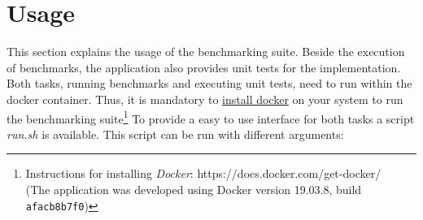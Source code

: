 \section{Usage}
This section explains the usage of the benchmarking suite. Beside the execution of benchmarks, the application also provides unit tests for the implementation. Both tasks, running benchmarks and executing unit tests, need to run within the docker container. Thus, it is mandatory to \href{https://docs.docker.com/get-docker/}{install docker} on your system to run the benchmarking suite\footnote{Instructions for installing \textit{Docker}: https://docs.docker.com/get-docker/\\(The application was developed using Docker version 19.03.8, build \texttt{afacb8b7f0})}
To provide a easy to use interface for both tasks a script \textit{run.sh} is available. This script can be run with different arguments:
